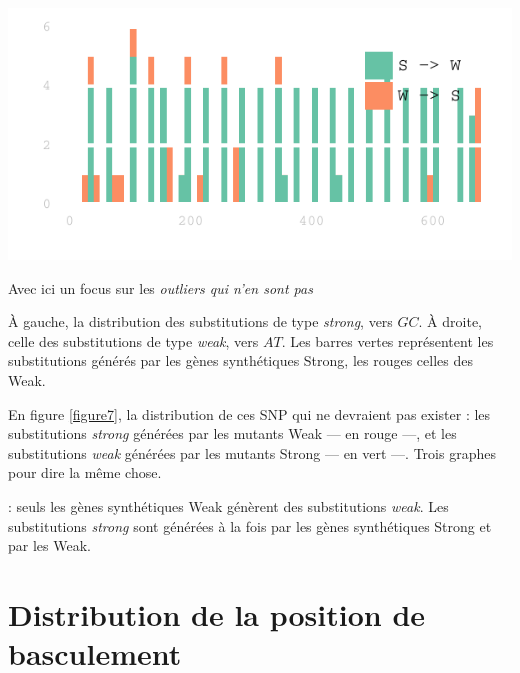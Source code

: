 \documentclass[a4paper]{tufte-handout}
\begin{document}
\begin{marginfigure}[5in]
  \includegraphics[width=\linewidth]{../outliers.pdf}
  \caption{Avec ici un focus sur les \em{outliers} qui n'en sont pas}
  \label{figure7}
\end{marginfigure}

À gauche, la distribution des substitutions de type \emph{strong}, vers \(GC\). À droite,
celle des substitutions de type \emph{weak}, vers \(AT\). Les barres vertes
représentent les substitutions générés par les gènes synthétiques Strong, les
rouges celles des Weak. 

En figure \ref{figure7}, la distribution de ces SNP qui ne devraient pas
exister : les substitutions \emph{strong} générées par les mutants Weak --- en rouge
---, et les substitutions \emph{weak} générées par les mutants Strong --- en vert
---. Trois graphes pour dire la même chose. 

 : seuls les gènes synthétiques Weak génèrent des
substitutions \emph{weak}. Les substitutions \emph{strong} sont générées à la fois par les
gènes synthétiques Strong et par les Weak.


\clearpage
\section{Distribution de la position de basculement}
\label{sec:orgheadline11}
\end{document}
